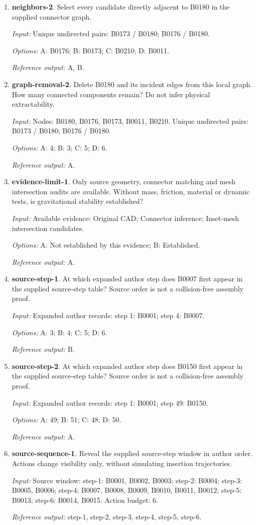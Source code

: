 \begin{enumerate}
\item \textbf{neighbors-2}. Select every candidate directly adjacent to B0180 in the supplied connector graph.\par {\small \textit{Input:} Unique undirected pairs: B0173 / B0180; B0176 / B0180. \par\textit{Options:} A: B0176; B: B0173; C: B0210; D: B0011. \par\textit{Reference output:} A, B.}
\item \textbf{graph-removal-2}. Delete B0180 and its incident edges from this local graph. How many connected components remain? Do not infer physical extractability.\par {\small \textit{Input:} Nodes: B0180, B0176, B0173, B0011, B0210. Unique undirected pairs: B0173 / B0180; B0176 / B0180. \par\textit{Options:} A: 4; B: 3; C: 5; D: 6. \par\textit{Reference output:} A.}
\item \textbf{evidence-limit-1}. Only source geometry, connector matching and mesh intersection audits are available. Without mass, friction, material or dynamic tests, is gravitational stability established?\par {\small \textit{Input:} Available evidence: Original CAD; Connector inference; Inset-mesh intersection candidates. \par\textit{Options:} A: Not established by this evidence; B: Established. \par\textit{Reference output:} A.}
\item \textbf{source-step-1}. At which expanded author step does B0007 first appear in the supplied source-step table? Source order is not a collision-free assembly proof.\par {\small \textit{Input:} Expanded author records: step 1: B0001; step 4: B0007. \par\textit{Options:} A: 3; B: 4; C: 5; D: 6. \par\textit{Reference output:} B.}
\item \textbf{source-step-2}. At which expanded author step does B0150 first appear in the supplied source-step table? Source order is not a collision-free assembly proof.\par {\small \textit{Input:} Expanded author records: step 1: B0001; step 49: B0150. \par\textit{Options:} A: 49; B: 51; C: 48; D: 50. \par\textit{Reference output:} A.}
\item \textbf{source-sequence-1}. Reveal the supplied source-step window in author order. Actions change visibility only, without simulating insertion trajectories.\par {\small \textit{Input:} Source window: step-1: B0001, B0002, B0003; step-2: B0004; step-3: B0005, B0006; step-4: B0007, B0008, B0009, B0010, B0011, B0012; step-5: B0013; step-6: B0014, B0015. Action budget: 6. \par\textit{Reference output:} step-1, step-2, step-3, step-4, step-5, step-6.}

\end{enumerate}
